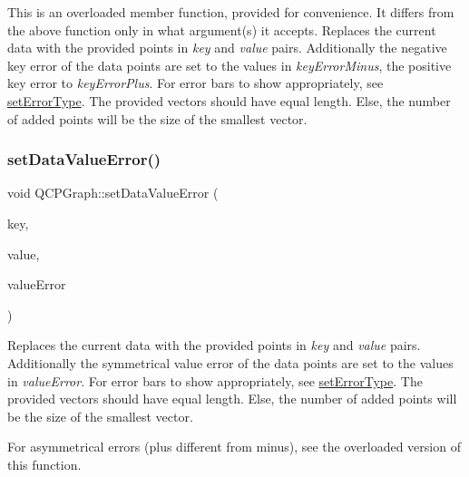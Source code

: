 This is an overloaded member function, provided for convenience. It differs from the above function only in what argument(s) it accepts. Replaces the current data with the provided points in {\itshape key} and {\itshape value} pairs. Additionally the negative key error of the data points are set to the values in {\itshape key\+Error\+Minus}, the positive key error to {\itshape key\+Error\+Plus}. For error bars to show appropriately, see \mbox{\hyperlink{class_q_c_p_graph_ac3614d799c3894f2bc646e99c7f73d38}{set\+Error\+Type}}. The provided vectors should have equal length. Else, the number of added points will be the size of the smallest vector. \mbox{\label{class_q_c_p_graph_acba6296eadcb36b93267628b8dae3de5}} 
\subsubsection{\texorpdfstring{set\+Data\+Value\+Error()}{setDataValueError()}\hspace{0.1cm}{\footnotesize\ttfamily [1/2]}}
{\footnotesize\ttfamily void Q\+C\+P\+Graph\+::set\+Data\+Value\+Error (\begin{DoxyParamCaption}\item[{const Q\+Vector$<$ double $>$ \&}]{key,  }\item[{const Q\+Vector$<$ double $>$ \&}]{value,  }\item[{const Q\+Vector$<$ double $>$ \&}]{value\+Error }\end{DoxyParamCaption})}

Replaces the current data with the provided points in {\itshape key} and {\itshape value} pairs. Additionally the symmetrical value error of the data points are set to the values in {\itshape value\+Error}. For error bars to show appropriately, see \mbox{\hyperlink{class_q_c_p_graph_ac3614d799c3894f2bc646e99c7f73d38}{set\+Error\+Type}}. The provided vectors should have equal length. Else, the number of added points will be the size of the smallest vector.

For asymmetrical errors (plus different from minus), see the overloaded version of this function. \mbox{\label{class_q_c_p_graph_a3afbfd7222d739351c69387904776f93}} 
